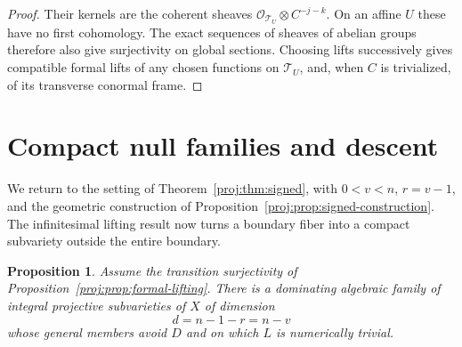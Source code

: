 \documentclass[11pt,letterpaper]{article}
\newtheorem{proposition}[theorem]{Proposition}
\theoremstyle{definition}
\theoremstyle{remark}
\begin{document}
\begin{proof}
Their kernels are the coherent sheaves
\(\mathcal{O}_{\mathcal T_U}\otimes C^{-j-k}\).  On an affine \(U\)
these have no first cohomology.  The exact sequences of sheaves
of abelian groups therefore also give surjectivity on global
sections.  Choosing lifts successively gives compatible formal
lifts of any chosen functions on \(\mathcal T_U\), and, when
\(C\) is trivialized, of its transverse conormal frame.
\end{proof}

\section{Compact null families and descent}
\label{proj:sg:descent}

We return to the setting of Theorem~\ref{proj:thm:signed}, with
$0<v<n$, $r=v-1$, and the geometric construction of
Proposition~\ref{proj:prop:signed-construction}.  The infinitesimal
lifting result now turns a boundary fiber into a compact
subvariety outside the entire boundary.

\begin{proposition}\label{proj:prop:null-family}
Assume the transition surjectivity of
Proposition~\ref{proj:prop:formal-lifting}.  There is a dominating
algebraic family of integral projective subvarieties of $X$
of dimension
\[
 d=n-1-r=n-v
\]
whose general members avoid $D$ and on which $L$ is
numerically trivial.
\end{proposition}
\end{document}
